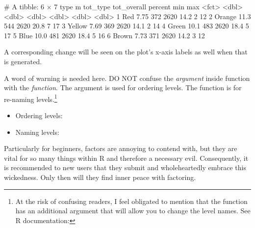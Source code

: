 \begin{outR}
# A tibble: 6 × 7
  type       m tot_type tot_overall percent   min   max
  <fct>  <dbl>    <dbl>       <dbl>   <dbl> <dbl> <dbl>
1 Red     7.75      372        2620    14.2     2    12
2 Orange 11.3       544        2620    20.8     7    17
3 Yellow  7.69      369        2620    14.1     2    14
4 Green  10.1       483        2620    18.4     5    17
5 Blue   10.0       481        2620    18.4     5    16
6 Brown   7.73      371        2620    14.2     3    12
\end{outR}

\noindent
A corresponding change will be seen on the plot's x-axis labels as well when that is generated.

A word of warning is needed here. DO NOT confuse the  \textit{argument} inside  function with the  \textit{function}. The  argument is used for ordering levels. The  function is for re-naming levels.\footnote{At the risk of confusing readers, I feel obligated to mention that the  function has an additional argument  that will allow you to change the level names. See R documentation: }

{
\begin{itemize}
    \item Ordering levels: 
    \item Naming levels: 
\end{itemize}
}

Particularly for beginners, factors are annoying to contend with, but they are vital for so many things within R and therefore a necessary evil. Consequently, it is recommended to new users that they submit and wholeheartedly embrace this wickedness. Only then will they find inner peace with factoring.
